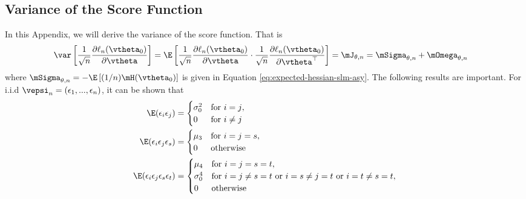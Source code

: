 \documentclass[english,12pt]{book}\usepackage[]{graphicx}\usepackage[]{xcolor}
\begin{document}
\begin{subappendices}
 \section{Variance of the Score Function}\label{appendix-score}

In this Appendix, we will derive the variance of the score function. That is
\begin{equation}
\begin{aligned}
 \var\left[\frac{1}{\sqrt{n}}\frac{\partial \ell_n (\vtheta_0)}{\partial \vtheta}\right] = \E\left[\frac{1}{\sqrt{n}}\frac{\partial \ell_n (\vtheta_0)}{\partial \vtheta}\cdot\frac{1}{\sqrt{n}}\frac{\partial \ell_n (\vtheta_0)}{\partial \vtheta^\top}\right] & = \mJ_{\theta, n} = \mSigma_{\theta, n} + \mOmega_{\theta, n}
  \end{aligned}
\end{equation}
%
where $\mSigma_{\theta, n}= - \E\left[(1/n)\mH(\vtheta_0)\right]$ is given in Equation \eqref{eq:expected-hessian-slm-asy}. The following results are important. For i.i.d $\vepsi_n = (\epsilon_1, ..., \epsilon_n)$, it can be shown that
\begin{equation}
\begin{aligned}
\E(\epsilon_i\epsilon_j) & = 
\begin{cases}
  \sigma_0^2 & \mbox{for $i = j$}, \\
  0          &  \mbox{for $i\neq j$}
\end{cases} \\
\E(\epsilon_i\epsilon_j\epsilon_s) & =
\begin{cases}
  \mu_3 & \mbox{for $i = j = s$}, \\
  0          &  \mbox{otherwise}
\end{cases} \\
\E(\epsilon_i\epsilon_j\epsilon_s\epsilon_t) & =
\begin{cases}
  \mu_4 & \mbox{for $i = j = s = t$}, \\
   \sigma_0^4          &  \mbox{for $i=j \neq s=t$ or $i =s\neq j= t$ or $i = t \neq s = t$}, \\
   0 & \mbox{otherwise}
\end{cases} \\
\end{aligned}
\end{equation}


\end{subappendices}
\end{document}
